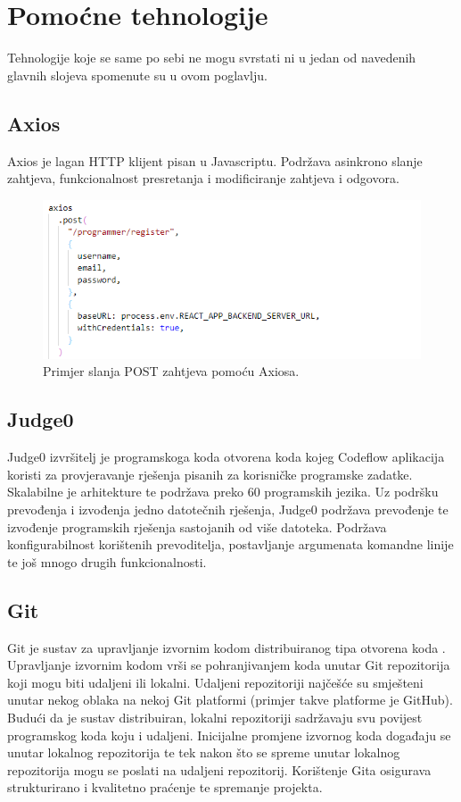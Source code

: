 \documentclass[times, utf8, zavrsni]{fer}
\begin{document}
			\section{Pomoćne tehnologije}
			Tehnologije koje se same po sebi ne mogu svrstati ni u jedan od navedenih glavnih slojeva spomenute su u ovom poglavlju.
			\subsection{Axios}
			Axios je lagan HTTP  klijent pisan u Javascriptu. Podržava asinkrono slanje zahtjeva, funkcionalnost presretanja i modificiranje zahtjeva i odgovora. 
			\begin{figure}[H]
				\centering
				\includegraphics[scale=0.65]{pictures/prikazi/Axios.png}
				\caption{Primjer slanja POST zahtjeva pomoću Axiosa.}
				\label{fig:axios}
			\end{figure}
			\subsection{Judge0}
			Judge0 izvršitelj je programskoga koda otvorena koda kojeg Codeflow aplikacija koristi za provjeravanje rješenja pisanih za korisničke programske zadatke. Skalabilne je arhitekture te podržava preko 60 programskih jezika. Uz podršku prevođenja i izvođenja jedno datotečnih rješenja, Judge0 podržava prevođenje te izvođenje programskih rješenja sastojanih od više datoteka. Podržava konfigurabilnost korištenih prevoditelja, postavljanje argumenata komandne linije te još mnogo drugih funkcionalnosti.
			\subsection{Git}
			Git je sustav za upravljanje izvornim kodom distribuiranog tipa otvorena koda . Upravljanje izvornim kodom vrši se pohranjivanjem koda unutar Git repozitorija koji mogu biti udaljeni ili lokalni. Udaljeni repozitoriji  najčešće su smješteni unutar nekog oblaka  na nekoj Git platformi (primjer takve platforme je GitHub). Budući da je sustav distribuiran, lokalni repozitoriji sadržavaju svu povijest programskog koda koju i udaljeni. Inicijalne promjene izvornog koda događaju se unutar lokalnog repozitorija te tek nakon što se spreme unutar lokalnog repozitorija mogu se poslati na udaljeni repozitorij. Korištenje Gita osigurava strukturirano i kvalitetno praćenje te spremanje projekta.
	
\end{document}
